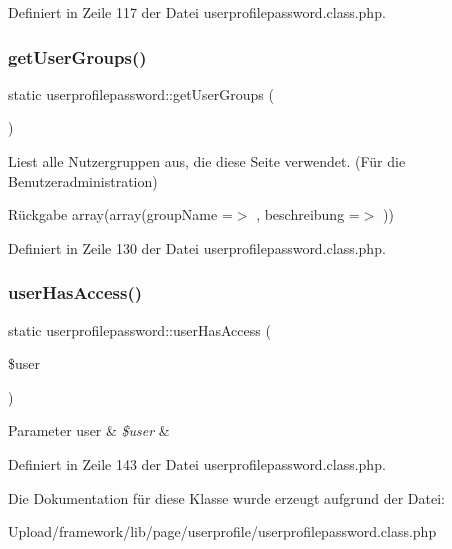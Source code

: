 Definiert in Zeile 117 der Datei userprofilepassword.\+class.\+php.

\mbox{\label{classuserprofilepassword_ac1fa76d498277c5768709301d384b98a}} 
\subsubsection{\texorpdfstring{get\+User\+Groups()}{getUserGroups()}}
{\footnotesize\ttfamily static userprofilepassword\+::get\+User\+Groups (\begin{DoxyParamCaption}{ }\end{DoxyParamCaption})\hspace{0.3cm}{\ttfamily [static]}}

Liest alle Nutzergruppen aus, die diese Seite verwendet. (Für die Benutzeradministration) \begin{DoxyReturn}{Rückgabe}
array(array(\textquotesingle{}group\+Name\textquotesingle{} =$>$ \textquotesingle{}\textquotesingle{}, \textquotesingle{}beschreibung\textquotesingle{} =$>$ \textquotesingle{}\textquotesingle{})) 
\end{DoxyReturn}


Definiert in Zeile 130 der Datei userprofilepassword.\+class.\+php.

\mbox{\label{classuserprofilepassword_afb3180bca662223fd08778c78547e6ce}} 
\subsubsection{\texorpdfstring{user\+Has\+Access()}{userHasAccess()}}
{\footnotesize\ttfamily static userprofilepassword\+::user\+Has\+Access (\begin{DoxyParamCaption}\item[{}]{\$user }\end{DoxyParamCaption})\hspace{0.3cm}{\ttfamily [static]}}


\begin{DoxyParams}[1]{Parameter}
user & {\em \$user} & \\
\hline
\end{DoxyParams}


Definiert in Zeile 143 der Datei userprofilepassword.\+class.\+php.



Die Dokumentation für diese Klasse wurde erzeugt aufgrund der Datei\+:\begin{DoxyCompactItemize}
\item 
Upload/framework/lib/page/userprofile/userprofilepassword.\+class.\+php\end{DoxyCompactItemize}
